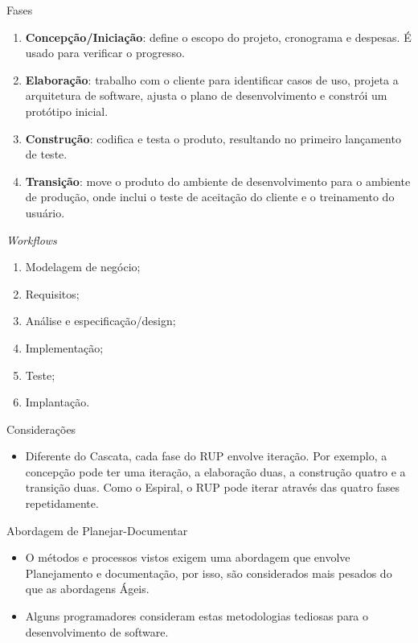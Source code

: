 \begin{frame}{\insertlecture}{Fases}
  \begin{enumerate}[<+-| alert@+>]
  \item {\bf Concepção/Iniciação}: define o escopo do projeto,
    cronograma e despesas. É usado para verificar o progresso.
  \item {\bf Elaboração}: trabalho com o cliente para identificar
    casos de uso, projeta a arquitetura de software, ajusta o plano de
    desenvolvimento e constrói um protótipo inicial.
  \item {\bf Construção}: codifica e testa o produto, resultando no
    primeiro lançamento de teste.
  \item {\bf Transição}: move o produto do ambiente de desenvolvimento
    para o ambiente de produção, onde inclui o teste de aceitação do
    cliente e o treinamento do usuário.
  \end{enumerate}
\end{frame}

\begin{frame}{\insertlecture}{\em Workflows}
  \begin{enumerate}[<+-| alert@+>]
  \item Modelagem de negócio;
  \item Requisitos;
  \item Análise e especificação/design;
  \item Implementação;
  \item Teste;
  \item Implantação.
  \end{enumerate}
\end{frame}

\begin{frame}{\insertlecture}{Considerações}
  \begin{itemize}
  \item Diferente do Cascata, cada fase do RUP envolve iteração. Por
    exemplo, a concepção pode ter uma iteração, a elaboração duas, a
    construção quatro e a transição duas. Como o Espiral, o RUP pode
    iterar através das quatro fases repetidamente.
  \end{itemize}  
\end{frame}

\begin{frame}{Abordagem de Planejar-Documentar}
  \begin{itemize}[<+-| alert@+>]
  \item O métodos e processos vistos exigem uma abordagem
    que envolve Planejamento e documentação, por isso, são considerados
    mais pesados do que as abordagens Ágeis.
  \item Alguns programadores consideram estas metodologias tediosas 
    para o desenvolvimento de software.
  \end{itemize}
\end{frame}

